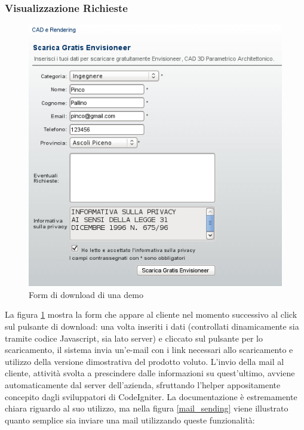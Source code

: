 \subsubsection{Visualizzazione Richieste}
\begin{figure}[!ht]
\centering
  \includegraphics[scale=0.75]{./images/downloadScreen.png}
\caption{Form di download di una demo}
\label{form_download}
\end{figure}

\noindent
La figura \ref{form_download} mostra la form che appare al cliente nel momento successivo al click sul pulsante di download: una volta inseriti i dati (controllati dinamicamente sia tramite codice Javascript, sia lato server) e cliccato sul pulsante per lo scaricamento, il sistema invia un'e-mail con i link necessari allo scaricamento e utilizzo della versione dimostrativa del prodotto voluto.
L'invio della mail al cliente, attivit\`a svolta a prescindere dalle informazioni su quest'ultimo, avviene automaticamente dal server dell'azienda, sfruttando l'helper appositamente concepito dagli sviluppatori di CodeIgniter. La documentazione \`e estremamente chiara riguardo al suo utilizzo, ma nella figura \ref{mail_sending} viene illustrato quanto semplice sia inviare una mail utilizzando queste funzionalit\`a:


